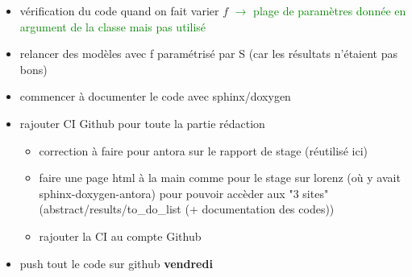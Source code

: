 \begin{itemize}[label=$\square$]
	\item[\done] vérification du code quand on fait varier $f$ \textcolor{Green}{$\rightarrow$ plage de paramètres donnée en argument de la classe mais pas utilisé}
	\item relancer des modèles avec f paramétrisé par S (car les résultats n'étaient pas bons)
	\item commencer à documenter le code avec sphinx/doxygen
	\item rajouter CI Github pour toute la partie rédaction
	\begin{itemize}[label=\LARGE $\circ$]
		\item correction à faire pour antora sur le rapport de stage (réutilisé ici)
		\item faire une page html à la main comme pour le stage sur lorenz (où y avait sphinx-doxygen-antora) pour pouvoir accèder aux "3 sites" (abstract/results/to\_do\_list (+ documentation des codes))
		\item rajouter la CI au compte Github
	\end{itemize}
	\item push tout le code sur github \textbf{vendredi}
\end{itemize}